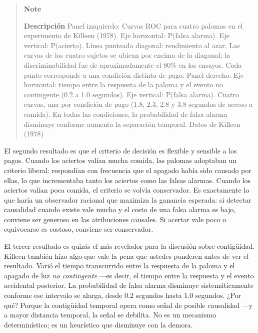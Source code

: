 \documentclass[
  letterpaper,
  DIV=11,
  numbers=noendperiod]{scrreprt}
\begin{document}
\begin{tcolorbox}[enhanced jigsaw, toprule=.15mm, arc=.35mm, colback=white, opacityback=0, colframe=quarto-callout-note-color-frame, breakable, rightrule=.15mm, left=2mm, leftrule=.75mm, bottomrule=.15mm]
\begin{figure}[H]
\end{figure}%

\begin{quote}
\textbf{Note}

\textbf{Descripción} Panel izzquierdo: Curvas ROC para cuatro palomas en
el experimento de Killeen (1978). Eje horizontal: P(falsa alarma). Eje
vertical: P(acierto). Línea punteada diagonal: rendimiento al azar. Las
curvas de los cuatro sujetos se ubican por encima de la diagonal; la
discriminabilidad fue de aproximadamente el 80\% en los ensayos. Cada
punto corresponde a una condición distinta de pago. Panel derecho: Eje
horizontal: tiempo entre la respuesta de la paloma y el evento no
contingente (0.2 a 1.0 segundos). Eje vertical: P(falsa alarma). Cuatro
curvas, una por condición de pago (1.8, 2.3, 2.8 y 3.8 segundos de
acceso a comida). En todas las condiciones, la probabilidad de falsa
alarma disminuye conforme aumenta la separación temporal. Datos de
Killeen (1978)
\end{quote}

El segundo resultado es que el criterio de decisión es flexible y
sensible a los pagos. Cuando los aciertos valían mucha comida, las
palomas adoptaban un criterio liberal: respondían con frecuencia que el
apagado había sido causado por ellas, lo que incrementaba tanto los
aciertos como las falsas alarmas. Cuando los aciertos valían poca
comida, el criterio se volvía conservador. Es exactamente lo que haría
un observador racional que maximiza la ganancia esperada: si detectar
causalidad cuando existe vale mucho y el costo de una falsa alarma es
bajo, conviene ser generoso en las atribuciones causales. Si acertar
vale poco o equivocarse es costoso, conviene ser conservador.

El tercer resultado es quizás el más revelador para la discusión sobre
contigüidad. Killeen también hizo algo que vale la pena que ustedes
ponderen antes de ver el resultado. Varió el tiempo transcurrido entre
la respuesta de la paloma y el apagado de luz \emph{no contingente}
---es decir, el tiempo entre la respuesta y el evento accidental
posterior. La probabilidad de falsa alarma disminuye sistemáticamente
conforme ese intervalo se alarga, desde 0.2 segundos hasta 1.0 segundos.
¿Por qué? Porque la contigüidad temporal opera como señal de posible
causalidad ---y a mayor distancia temporal, la señal se debilita. No es
un mecanismo determinístico; es un heurístico que disminuye con la
demora.


\end{tcolorbox}
\end{document}
